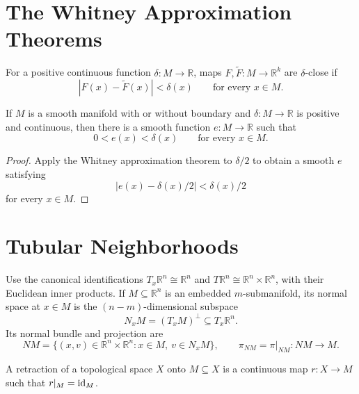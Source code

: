 \section{The Whitney Approximation Theorems}

\begin{definition}
\label{def:6-41-extra-1}




For a positive continuous function $\delta:M\to\mathbb{R}$, maps $F,\widetilde F:M\to\mathbb{R}^k$ are $\delta$-close if
\[
|F(x)-\widetilde F(x)|<\delta(x)
\qquad\text{for every }x\in M.
\]
\end{definition}

\begin{corollary}
\label{cor:6-22}




If $M$ is a smooth manifold with or without boundary and $\delta:M\to\mathbb{R}$ is positive and continuous, then there is a smooth function $e:M\to\mathbb{R}$ such that
\[
0<e(x)<\delta(x)
\qquad\text{for every }x\in M.
\]
\end{corollary}

\begin{proof}

\sketch Apply the Whitney approximation theorem to $\delta/2$ to obtain a smooth $e$ satisfying
\[
|e(x)-\delta(x)/2|<\delta(x)/2
\]
for every $x\in M$.
\end{proof}


\section{Tubular Neighborhoods}

\begin{definition}
\label{def:6-42-extra-1}




Use the canonical identifications $T_x\mathbb{R}^n\cong\mathbb{R}^n$ and $T\mathbb{R}^n\cong\mathbb{R}^n\times\mathbb{R}^n$, with their Euclidean inner products. If $M\subseteq\mathbb{R}^n$ is an embedded $m$-submanifold, its normal space at $x\in M$ is the $(n-m)$-dimensional subspace
\[
N_xM=(T_xM)^\perp\subseteq T_x\mathbb{R}^n.
\]
Its normal bundle and projection are
\[
NM=\{(x,v)\in\mathbb{R}^n\times\mathbb{R}^n:x\in M,\ v\in N_xM\},
\qquad
\pi_{NM}=\pi|_{NM}:NM\to M.
\]
\end{definition}

\begin{definition}
\label{def:6-42-extra-3}




A retraction of a topological space $X$ onto $M\subseteq X$ is a continuous map $r:X\to M$ such that $r|_M=\operatorname{id}_M$.
\end{definition}


